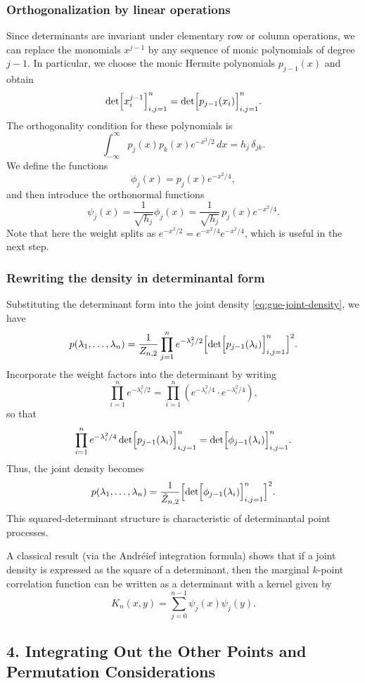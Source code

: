 \documentclass[letterpaper,11pt,oneside,reqno]{article}
\numberwithin{equation}{section}
\theoremstyle{definition}
\begin{document}
\subsubsection{Orthogonalization by linear operations}

Since determinants are invariant under elementary row or column
operations, we can replace the monomials $x^{j-1}$ by
any sequence of monic polynomials of degree $j-1$. In
particular, we choose the monic Hermite polynomials
$p_{j-1}(x)$ and obtain
\[
\det\Bigl[x_i^{j-1}\Bigr]_{i,j=1}^n = \det\Bigl[p_{j-1}(x_i)\Bigr]_{i,j=1}^n.
\]
The orthogonality condition for these polynomials is
\[
\int_{-\infty}^\infty p_j(x)p_k(x)e^{-x^2/2}\,dx = h_j\,\delta_{jk}.
\]
We define the functions
\[
\phi_j(x)=p_j(x)e^{-x^2/4},
\]
and then introduce the orthonormal functions
\[
\psi_j(x)=\frac{1}{\sqrt{h_j}}\phi_j(x)=\frac{1}{\sqrt{h_j}}\,p_j(x)e^{-x^2/4}.
\]
Note that here the weight splits as $e^{-x^2/2}=e^{-x^2/4}e^{-x^2/4}$, which is useful in the next step.

\subsubsection{Rewriting the density in determinantal form}

Substituting the determinant form into the joint density \eqref{eq:gue-joint-density}, we have
\[
p(\lambda_1,\dots,\lambda_n)= \frac{1}{Z_{n,2}}\prod_{j=1}^n e^{-\lambda_j^2/2} \Bigl[\det\Bigl[p_{j-1}(\lambda_i)\Bigr]_{i,j=1}^n\Bigr]^2.
\]
Incorporate the weight factors into the determinant by writing
\[
\prod_{i=1}^n e^{-\lambda_i^2/2} = \prod_{i=1}^n \left(e^{-\lambda_i^2/4}\cdot e^{-\lambda_i^2/4}\right),
\]
so that
\[
\prod_{i=1}^n e^{-\lambda_i^2/4}\det\Bigl[p_{j-1}(\lambda_i)\Bigr]_{i,j=1}^n = \det\Bigl[\phi_{j-1}(\lambda_i)\Bigr]_{i,j=1}^n.
\]
Thus, the joint density becomes
\[
p(\lambda_1,\dots,\lambda_n)=\frac{1}{\tilde{Z}_{n,2}} \Bigl[\det\Bigl[\phi_{j-1}(\lambda_i)\Bigr]_{i,j=1}^n\Bigr]^2.
\]
This squared-determinant structure is characteristic of determinantal point processes.

A classical result (via the Andr\'eief integration formula) shows that if a joint density is expressed as the square of a determinant, then the marginal $k$-point correlation function can be written as a determinant with a kernel given by
\[
K_n(x,y)=\sum_{j=0}^{n-1}\psi_j(x)\psi_j(y).
\]

\subsection*{4. Integrating Out the Other Points and Permutation Considerations}
\end{document}
